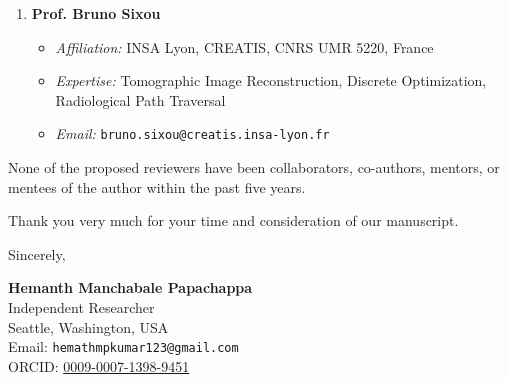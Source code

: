 \documentclass[11pt]{article}
\begin{document}
\begin{enumerate}
\begin{itemize}
        \item \textit{Expertise:} Geometric Clipping Algorithms, Projective Coordinates, High-Performance Rasterization
        \item \textit{Email:} \texttt{skala@kiv.zcu.cz}
    \end{itemize}
    \item \textbf{Prof. Bruno Sixou}
    \begin{itemize}
        \item \textit{Affiliation:} INSA Lyon, CREATIS, CNRS UMR 5220, France
        \item \textit{Expertise:} Tomographic Image Reconstruction, Discrete Optimization, Radiological Path Traversal
        \item \textit{Email:} \texttt{bruno.sixou@creatis.insa-lyon.fr}
    \end{itemize}
\end{enumerate}

\noindent None of the proposed reviewers have been collaborators, co-authors, mentors, or mentees of the author within the past five years.

\vspace{0.4cm}
\noindent Thank you very much for your time and consideration of our manuscript.

\vspace{0.6cm}
\noindent Sincerely,

\vspace{0.3cm}
\noindent \textbf{Hemanth Manchabale Papachappa}\\
Independent Researcher\\
Seattle, Washington, USA\\
Email: \texttt{hemathmpkumar123@gmail.com}\\
ORCID: \href{https://orcid.org/0009-0007-1398-9451}{0009-0007-1398-9451}
\end{document}

